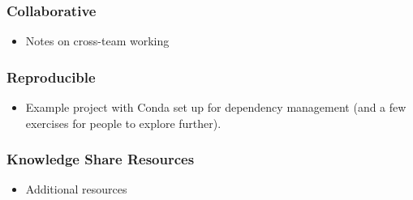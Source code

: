 \documentclass[]{book}
\providecommand{\tightlist}{%
  \setlength{\itemsep}{0pt}\setlength{\parskip}{0pt}}
\begin{document}
\hypertarget{collaborative}{%
\subsubsection*{Collaborative}\label{collaborative}}

\begin{itemize}
\tightlist
\item
  Notes on cross-team working
\end{itemize}

\hypertarget{reproducible}{%
\subsubsection*{Reproducible}\label{reproducible}}

\begin{itemize}
\tightlist
\item
  Example project with Conda set up for dependency management (and a few exercises for people to explore further).
\end{itemize}

\hypertarget{knowledge-share-resources}{%
\subsubsection*{Knowledge Share Resources}\label{knowledge-share-resources}}

\begin{itemize}
\tightlist
\item
  Additional resources
\end{itemize}
\end{document}
